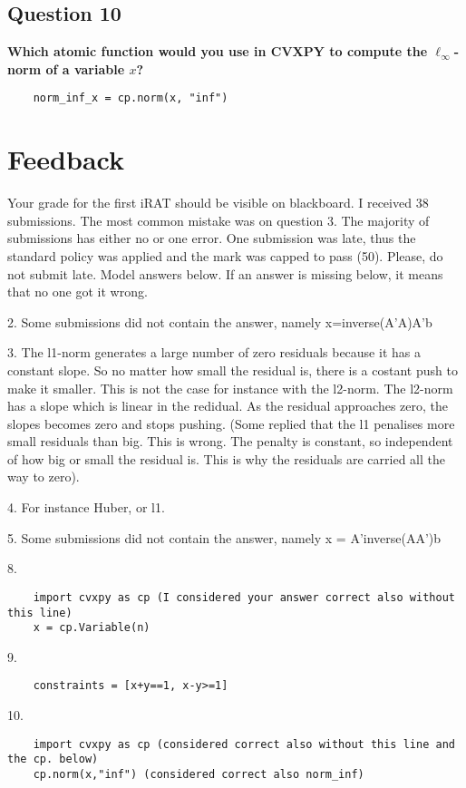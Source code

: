 \subsection*{Question 10}
\textbf{Which atomic function would you use in CVXPY to compute the $\ell_\infty$-norm of a variable $x$?}

\begin{lstlisting}
    norm_inf_x = cp.norm(x, "inf")
\end{lstlisting}

\newpage

\section*{Feedback}

Your grade for the first iRAT should be visible on blackboard. I received 38 submissions. The most common mistake was on question 3. The majority of submissions has either no or one error. One submission was late, thus the standard policy was applied and the mark was capped to pass (50). Please, do not submit late. Model answers below. If an answer is missing below, it means that no one got it wrong.

2. Some submissions did not contain the answer, namely x=inverse(A'A)A'b

3. The l1-norm generates a large number of zero residuals because it has a constant slope. So no matter how small the residual is, there is a costant push to make it smaller. This is not the case for instance with the l2-norm. The l2-norm has a slope which is linear in the redidual. As the residual approaches zero, the slopes becomes zero and stops pushing. (Some replied that the l1 penalises more small residuals than big. This is wrong. The penalty is constant, so independent of how big or small the residual is. This is why the residuals are carried all the way to zero).

4. For instance Huber, or l1.

5. Some submissions did not contain the answer, namely x = A'inverse(AA')b

8. 

\begin{lstlisting}
    import cvxpy as cp (I considered your answer correct also without this line)
    x = cp.Variable(n)
\end{lstlisting}

9. 

\begin{lstlisting}
    constraints = [x+y==1, x-y>=1]
\end{lstlisting}

10. 

\begin{lstlisting}
    import cvxpy as cp (considered correct also without this line and the cp. below)
    cp.norm(x,"inf") (considered correct also norm_inf)
\end{lstlisting}
